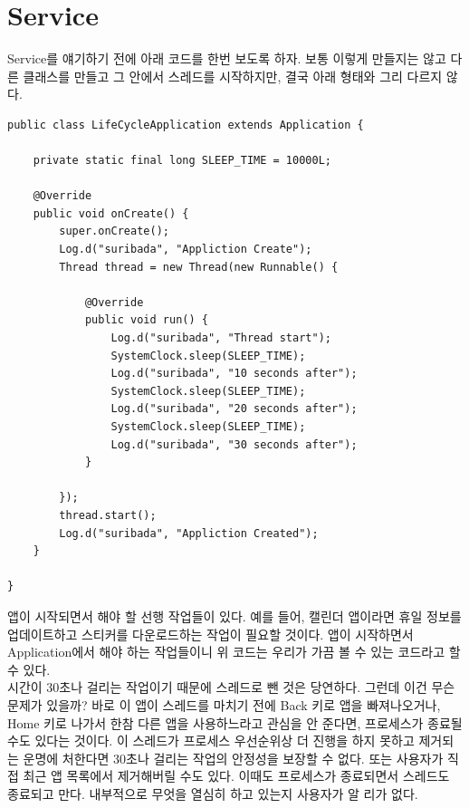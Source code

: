 \chapter{Service}
Service를 얘기하기 전에 아래 코드를 한번 보도록 하자. 보통 이렇게 만들지는 않고 다른 클래스를 만들고 그 안에서 스레드를 시작하지만, 결국 아래 형태와 그리 다르지 않다.\\

\begin{lstlisting}[frame=single]
public class LifeCycleApplication extends Application {
	
	private static final long SLEEP_TIME = 10000L;
	
	@Override
	public void onCreate() {
		super.onCreate();
		Log.d("suribada", "Appliction Create");
		Thread thread = new Thread(new Runnable() {

			@Override
			public void run() {
				Log.d("suribada", "Thread start");
				SystemClock.sleep(SLEEP_TIME);
				Log.d("suribada", "10 seconds after");
				SystemClock.sleep(SLEEP_TIME);
				Log.d("suribada", "20 seconds after");
				SystemClock.sleep(SLEEP_TIME);
				Log.d("suribada", "30 seconds after");
			}
			
		});
		thread.start();
		Log.d("suribada", "Appliction Created");
	}

}
\end{lstlisting}

앱이 시작되면서 해야 할 선행 작업들이 있다. 예를 들어, 캘린더 앱이라면 휴일 정보를 업데이트하고 스티커를 다운로드하는 작업이 필요할 것이다. 앱이 시작하면서 Application에서 해야 하는 작업들이니 위 코드는 우리가 가끔 볼 수 있는 코드라고 할 수 있다.\\

시간이 30초나 걸리는 작업이기 때문에 스레드로 뺀 것은 당연하다. 그런데 이건 무슨 문제가 있을까? 
바로 이 앱이 스레드를 마치기 전에 Back 키로 앱을 빠져나오거나, Home 키로 나가서 한참 다른 앱을 사용하느라고 관심을 안 준다면, 프로세스가 종료될 수도 있다는 것이다. 이 스레드가 프로세스 우선순위상 더 진행을 하지 못하고 제거되는 운명에 처한다면 30초나 걸리는 작업의 안정성을 보장할 수 없다.
또는 사용자가 직접 최근 앱 목록에서 제거해버릴 수도 있다. 이때도 프로세스가 종료되면서 스레드도 종료되고 만다. 내부적으로 무엇을 열심히 하고 있는지 사용자가 알 리가 없다.\\

